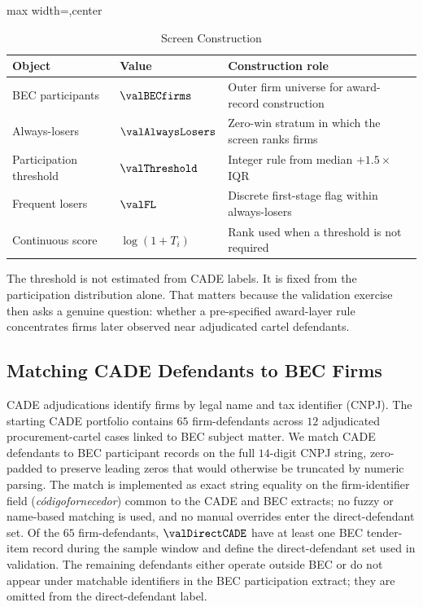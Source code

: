 \begin{table}[htbp]
\centering
\caption{Screen Construction}
\label{tab:screen_construction_app_submission}
\footnotesize
\begin{adjustbox}{max width=\textwidth,center}
\begin{tabular}{p{4.0cm}p{3.0cm}p{6.5cm}}
\toprule
Object & Value & Construction role \\
\midrule
BEC participants & $\valBECfirms$ & Outer firm universe for award-record construction \\
Always-losers & $\valAlwaysLosers$ & Zero-win stratum in which the screen ranks firms \\
Participation threshold & $\valThreshold$ & Integer rule from median $+1.5\times$IQR \\
Frequent losers & $\valFL$ & Discrete first-stage flag within always-losers \\
Continuous score & $\log(1+T_i)$ & Rank used when a threshold is not required \\
\bottomrule
\end{tabular}
\end{adjustbox}
\end{table}

The threshold is not estimated from CADE labels. It is fixed from
the participation distribution alone. That matters because the
validation exercise then asks a genuine question: whether a
pre-specified award-layer rule concentrates firms later observed
near adjudicated cartel defendants.

\subsection{Matching CADE Defendants to BEC Firms}
\label{app:cade_matching_submission}

CADE adjudications identify firms by legal name and tax
identifier (CNPJ). The starting CADE portfolio contains $65$
firm-defendants across $12$ adjudicated procurement-cartel
cases linked to BEC subject matter. We match CADE defendants
to BEC participant records on the full $14$-digit CNPJ string,
zero-padded to preserve leading zeros that would otherwise be
truncated by numeric parsing. The match is implemented as exact
string equality on the firm-identifier field
(\emph{c\'odigofornecedor}) common to the CADE and BEC extracts;
no fuzzy or name-based matching is used, and no manual
overrides enter the direct-defendant set. Of the $65$
firm-defendants, $\valDirectCADE$ have at least one BEC
tender-item record during the sample window and define the
direct-defendant set used in validation. The remaining
defendants either operate outside BEC or do not appear under
matchable identifiers in the BEC participation extract; they are
omitted from the direct-defendant label.

